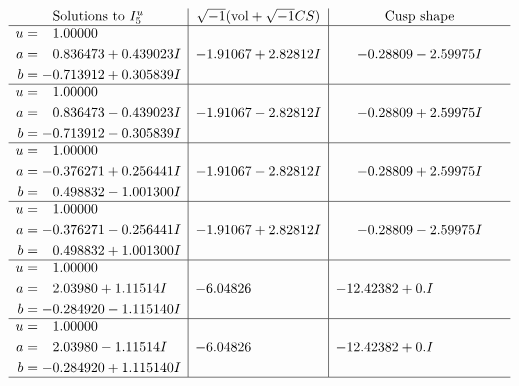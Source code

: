 \documentclass[1p]{elsarticle_modified}
\theoremstyle{definition}
\newcommand{\I}{\sqrt{-1}}
\begin{document}
$$\begin{array}{c|c|c}  
\text{Solutions to }I^u_{5}& \I (\text{vol} + \sqrt{-1}CS) & \text{Cusp shape}\\
 \hline 
\begin{aligned}
u &= \phantom{-}1.00000\phantom{ +0.000000I} \\
a &= \phantom{-}0.836473 + 0.439023 I \\
b &= -0.713912 + 0.305839 I\end{aligned}
 & -1.91067 + 2.82812 I & -0.28809 - 2.59975 I \\ \hline\begin{aligned}
u &= \phantom{-}1.00000\phantom{ +0.000000I} \\
a &= \phantom{-}0.836473 - 0.439023 I \\
b &= -0.713912 - 0.305839 I\end{aligned}
 & -1.91067 - 2.82812 I & -0.28809 + 2.59975 I \\ \hline\begin{aligned}
u &= \phantom{-}1.00000\phantom{ +0.000000I} \\
a &= -0.376271 + 0.256441 I \\
b &= \phantom{-}0.498832 - 1.001300 I\end{aligned}
 & -1.91067 - 2.82812 I & -0.28809 + 2.59975 I \\ \hline\begin{aligned}
u &= \phantom{-}1.00000\phantom{ +0.000000I} \\
a &= -0.376271 - 0.256441 I \\
b &= \phantom{-}0.498832 + 1.001300 I\end{aligned}
 & -1.91067 + 2.82812 I & -0.28809 - 2.59975 I \\ \hline\begin{aligned}
u &= \phantom{-}1.00000\phantom{ +0.000000I} \\
a &= \phantom{-}2.03980 + 1.11514 I \\
b &= -0.284920 - 1.115140 I\end{aligned}
 & -6.04826\phantom{ +0.000000I} & -12.42382 + 0. I\phantom{ +0.000000I} \\ \hline\begin{aligned}
u &= \phantom{-}1.00000\phantom{ +0.000000I} \\
a &= \phantom{-}2.03980 - 1.11514 I \\
b &= -0.284920 + 1.115140 I\end{aligned}
 & -6.04826\phantom{ +0.000000I} & -12.42382 + 0. I\phantom{ +0.000000I}\\
 \hline 
 \end{array}$$\newpage
\end{document}
